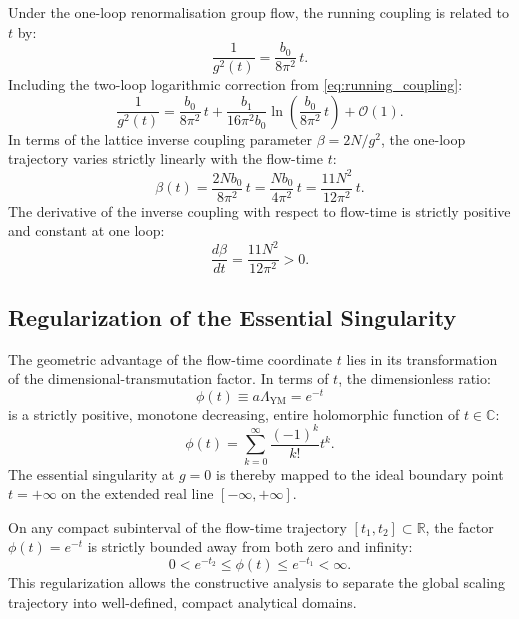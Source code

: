 Under the one-loop renormalisation group flow, the running coupling is related to $t$ by:
\begin{equation}
\label{eq:coupling_flow_time}
\frac{1}{g^2(t)} = \frac{b_0}{8\pi^2} \, t.
\end{equation}
Including the two-loop logarithmic correction from \eqref{eq:running_coupling}:
\begin{equation}
\label{eq:coupling_flow_time_twoloop}
\frac{1}{g^2(t)} = \frac{b_0}{8\pi^2} \, t + \frac{b_1}{16\pi^2 b_0} \ln\left( \frac{b_0}{8\pi^2} \, t \right) + \mathcal{O}(1).
\end{equation}
In terms of the lattice inverse coupling parameter $\beta = 2N/g^2$, the one-loop trajectory varies strictly linearly with the flow-time $t$:
\begin{equation}
\label{eq:beta_flow_time}
\beta(t) = \frac{2N b_0}{8\pi^2} \, t = \frac{N b_0}{4\pi^2} \, t = \frac{11 N^2}{12\pi^2} \, t.
\end{equation}
The derivative of the inverse coupling with respect to flow-time is strictly positive and constant at one loop:
\begin{equation}
\label{eq:dbeta_dt}
\frac{d\beta}{dt} = \frac{11 N^2}{12\pi^2} > 0.
\end{equation}

\subsection{Regularization of the Essential Singularity}
\label{subsec:singularity_regularization}

The geometric advantage of the flow-time coordinate $t$ lies in its transformation of the dimensional-transmutation factor. In terms of $t$, the dimensionless ratio:
\begin{equation}
\label{eq:scale_factor_entire}
\phi(t) \equiv a \Lambda_{\mathrm{YM}} = e^{-t}
\end{equation}
is a strictly positive, monotone decreasing, entire holomorphic function of $t \in \mathbb{C}$:
\begin{equation}
\phi(t) = \sum_{k=0}^\infty \frac{(-1)^k}{k!} t^k.
\end{equation}
The essential singularity at $g = 0$ is thereby mapped to the ideal boundary point $t = +\infty$ on the extended real line $[-\infty, +\infty]$. 

On any compact subinterval of the flow-time trajectory $[t_1, t_2] \subset \mathbb{R}$, the factor $\phi(t) = e^{-t}$ is strictly bounded away from both zero and infinity:
\begin{equation}
0 < e^{-t_2} \le \phi(t) \le e^{-t_1} < \infty.
\end{equation}
This regularization allows the constructive analysis to separate the global scaling trajectory into well-defined, compact analytical domains.

